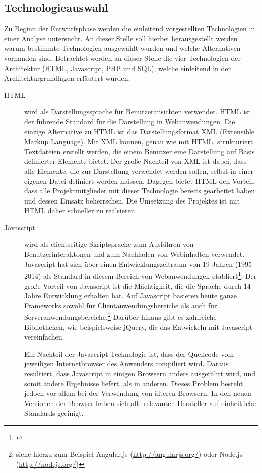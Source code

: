 \subsection{Technologieauswahl}
\label{sec:Technologieauswahl}

Zu Beginn der Entwurfsphase werden die einleitend vorgestellten Technologien in
einer Analyse untersucht. An dieser Stelle soll hierbei herausgestellt werden
warum bestimmte Technologien ausgewählt wurden und welche Alternativen vorhanden
sind. Betrachtet werden an dieser Stelle die vier Technologien der Architektur
(HTML, Javascript, PHP und SQL), welche einleitend in den Architekturgrundlagen
erläutert wurden.

\begin{description}
  \item[HTML] wird als Darstellungssprache für Benutzeransichten verwendet.
  HTML ist der führende Standard für die Darstellung in Webanwendungen. Die
  einzige Alternative zu HTML ist das Darstellungsformat XML (Extensible Markup
  Language). Mit XML können, genau wie mit HTML, strukturiert Textdateien
  erstellt werden, die einem Benutzer eine Darstellung auf Basis definierter
  Elemente bietet. Der große Nachteil von XML ist dabei, dass alle Elemente,
  die zur Darstellung verwendet werden sollen, selbst in einer eigenen Datei
  definiert werden müssen. Dagegen bietet HTML den Vorteil, dass alle  
  Projektmitglieder mit dieser Technologie bereits gearbeitet haben und dessen
  Einsatz beherrschen. Die Umsetzung des Projektes ist mit HTML daher
  schneller zu realsieren.
  \item[Javascript] wird als clientseitige Skriptsprache zum Ausführen von
  Benutzerinteraktonen und zum Nachladen von Webinhalten verwendet. Javascript
  hat sich über einen Entwicklungszeitraum von 19 Jahren (1995-2014) als
  Standard in diesem Bereich von Webanwendungen  
  etabliert\footnote{\citet[S.~2]{powers2007}}. Der große Vorteil von Javascript
  ist die Mächtigkeit, die die Sprache durch 14 Jahre Entwicklung erhalten hat.
  Auf Javascript basieren heute ganze Frameworks sowohl für
  Clientanwendungsbereiche als auch für Serveranwendungsbereiche.\footnote{siehe
  hierzu zum Beispiel Angular.js (\url{http://angularjs.org/}) oder Node.js
  (\url{http://nodejs.org/})} Darüber hinaus gibt es zahlreiche Bibliotheken,
  wie beispielsweise jQuery, die das Entwickeln mit Javascript vereinfachen. 
  
  Ein Nachteil der Javascript-Technologie ist, dass der Quellcode vom jeweiligen
  Internetbrowser des Anwenders compiliert wird. Daraus resultiert, dass
  Javascript in einigen Browsern anders ausgeführt wird, und somit andere
  Ergebnisse liefert, als in anderen. Dieses Problem besteht jedoch vor allem
  bei der Verwendung von älteren Browsern. In den neuen Versionen der
  Browser haben sich alle relevanten Hersteller auf einheitliche Standards
  geeinigt. 
  

\end{description}
